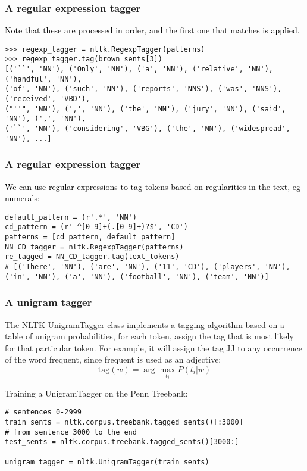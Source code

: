 \begin{frame}[fragile]\frametitle{A regular expression tagger}
\textcolor{black}{
Note that these are processed in order, and the first one that matches is applied. }
\small
\begin{lstlisting}
>>> regexp_tagger = nltk.RegexpTagger(patterns)
>>> regexp_tagger.tag(brown_sents[3])
[('``', 'NN'), ('Only', 'NN'), ('a', 'NN'), ('relative', 'NN'), ('handful', 'NN'),
('of', 'NN'), ('such', 'NN'), ('reports', 'NNS'), ('was', 'NNS'), ('received', 'VBD'),
("''", 'NN'), (',', 'NN'), ('the', 'NN'), ('jury', 'NN'), ('said', 'NN'), (',', 'NN'),
('``', 'NN'), ('considering', 'VBG'), ('the', 'NN'), ('widespread', 'NN'), ...]
\end{lstlisting}
\end{frame}


\begin{frame}[fragile]\frametitle{A regular expression tagger}
\textcolor{black}{
We can use regular expressions to tag tokens based on regularities in
the text, eg numerals:}
\small
\begin{lstlisting}
default_pattern = (r'.*', 'NN')
cd_pattern = (r' ^[0-9]+(.[0-9]+)?$', 'CD')
patterns = [cd_pattern, default_pattern]
NN_CD_tagger = nltk.RegexpTagger(patterns)
re_tagged = NN_CD_tagger.tag(text_tokens)
# [('There', 'NN'), ('are', 'NN'), ('11', 'CD'), ('players', 'NN'), 
('in', 'NN'), ('a', 'NN'), ('football', 'NN'), ('team', 'NN')]
\end{lstlisting}
\end{frame}



\begin{frame}[fragile]\frametitle{A unigram tagger}
The NLTK UnigramTagger class implements a tagging algorithm based on a
table of unigram probabilities, for each token, assign the tag that is most likely for that particular token. For example, it will assign the tag JJ to any occurrence of the word frequent, since frequent is used as an adjective:
\[ \mbox{tag}(w) = \arg\max_{t_i} P(t_i|w) \]

Training a UnigramTagger on the Penn Treebank:
{\small
\begin{lstlisting}
# sentences 0-2999
train_sents = nltk.corpus.treebank.tagged_sents()[:3000]
# from sentence 3000 to the end
test_sents = nltk.corpus.treebank.tagged_sents()[3000:]

unigram_tagger = nltk.UnigramTagger(train_sents)
\end{lstlisting}}
\end{frame}



